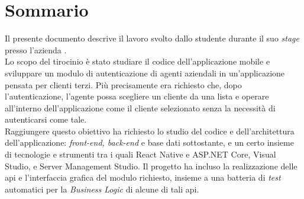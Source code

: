 \cleardoublepage
{}
{}
\begingroup
\let\clearpage\relax
\let\cleardoublepage\relax
\chapter*{Sommario}

Il presente documento descrive il lavoro svolto dallo studente {\myName} durante il suo \textit{stage} presso l’azienda {\companyLong}.\\
Lo scopo del tirocinio è stato studiare il codice dell’applicazione mobile {\movi} e sviluppare un modulo di autenticazione di agenti aziendali 
in un'applicazione pensata per clienti terzi. Più precisamente era richiesto che, dopo l’autenticazione, l’agente possa scegliere un cliente da una 
lista e operare all’interno dell’applicazione come il cliente selezionato senza la necessità di autenticarsi come tale.\\
Raggiungere questo obiettivo ha richiesto lo studio del codice e dell’architettura dell’applicazione: \textit{front-end, back-end} e base dati 
sottostante, e un certo insieme di tecnologie e strumenti tra i quali React Native e ASP.NET Core, Visual Studio, e Server Management Studio. 
Il progetto ha incluso la realizzazione delle \gls{api} e l’interfaccia grafica del modulo richiesto, insieme a una batteria di \textit{test} automatici per la 
\textit{Business Logic} di alcune di tali \gls{api}.\\\\

